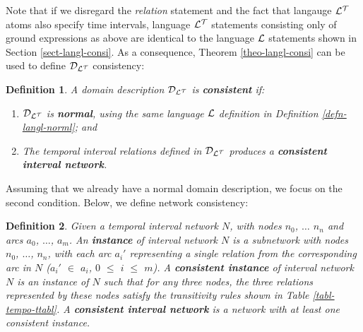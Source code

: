 \documentclass[11pt]{report}
\newtheorem{vdefinition}{Definition}[chapter]
\begin{document}
      Note that if we disregard the {\em relation} statement and the fact
      that langauge ${\cal L^T}$ atoms also specify time intervals, language
      ${\cal L^T}$ statements consisting only of ground expressions as above
      are identical to the language ${\cal L}$ statements shown in Section
      \ref{sect-langl-consi}. As a consequence, Theorem \ref{theo-langl-consi}
      can be used to define ${\cal D_{L^T}}$ consistency:

      \begin{vdefinition}
        \label{defn-tempo-cons1}
        A domain description ${\cal D_{L^T}}$ is {\bf consistent} if:

        \begin{enumerate}
          \item
            \label{defn-tempo-cons1-1}
            ${\cal D_{L^T}}$ is {\bf normal}, using the same language
            ${\cal L}$ definition in Definition \ref{defn-langl-norml}; and

          \item
            \label{defn-tempo-cons1-2}
            The temporal interval relations defined in ${\cal D_{L^T}}$
            produces a {\bf consistent interval network}.
        \end{enumerate}
      \end{vdefinition}

      Assuming that we already have a normal domain description, we focus on
      the second condition. Below, we define network consistency:

      \begin{vdefinition}
        \label{defn-tempo-cons2}
        Given a temporal interval network $N$, with nodes $n_0$,
        $\ldots$ $n_n$ and arcs $a_0$, $\ldots$, $a_m$. An {\bf instance} of
        interval network $N$ is a subnetwork with nodes $n_0$, $\ldots$, $n_n$,
        with each arc $a_{i}'$ representing a single relation from the
        corresponding arc in $N$ ($a_{i}'$ $\in$ $a_i$, $0$ $\leq$ $i$ $\leq$
        $m$). A {\bf consistent instance} of interval network $N$ is an
        instance of $N$ such that for any three nodes, the three relations
        represented by these nodes satisfy the transitivity rules shown in
        Table \ref{tabl-tempo-ttabl}. A {\bf consistent interval network} is a
        network with at least one consistent instance.
      \end{vdefinition}
\end{document}
